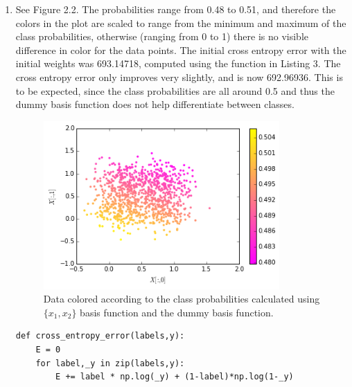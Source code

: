 \documentclass[a4paper,10pt]{article}
\numberwithin{equation}{section} %
\numberwithin{figure}{section} %
\numberwithin{table}{section} %
\theoremstyle{mytheor}
\begin{document}
\begin{enumerate}
	\item See Figure 2.2. The probabilities range from 0.48 to 0.51, and therefore the colors in the plot are scaled to range from the minimum and maximum of the class probabilities, otherwise (ranging from 0 to 1) there is no visible difference in color for the data points. The initial cross entropy error with the initial weights was 693.14718, computed using the function in Listing 3. The cross entropy error only improves very slightly, and is now 692.96936. This is to be expected, since the class probabilities are all around 0.5 and thus the dummy basis function does not help differentiate between classes.
		\begin{figure}[h!]
   			\centering
   			\includegraphics[width=0.85\textwidth]{exercise2plottadummy.png}\vspace{-0.4cm}
   			\caption{\vspace{-0.0cm} Data colored according to the class probabilities calculated using $\{x_1,x_2\}$ basis function and the dummy basis function.}
  		\end{figure}
		 \begin{lstlisting}[label={list:first},caption=Python code for function \textit{cross\_entropy\_error(labels, y)}.]
def cross_entropy_error(labels,y):
    E = 0
    for label,_y in zip(labels,y):
        E += label * np.log(_y) + (1-label)*np.log(1-_y)
        

\end{lstlisting}
\end{enumerate}
\end{document}
